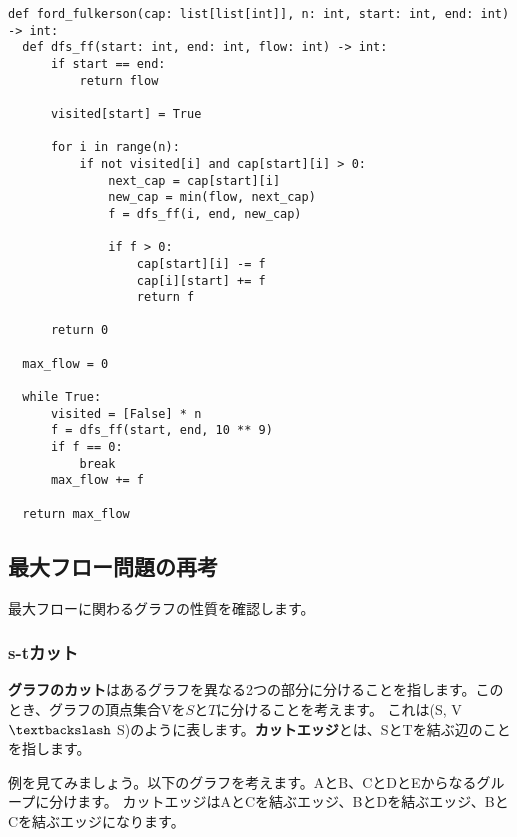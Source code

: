 \documentclass{jlreq}
\begin{document}
\begin{lstlisting}[caption=フォード・ファルカーソン法の実装, label=ford_fulkerson, frame=TRBL, label={ford_fulkerson}]
def ford_fulkerson(cap: list[list[int]], n: int, start: int, end: int) -> int:
  def dfs_ff(start: int, end: int, flow: int) -> int:
      if start == end:
          return flow

      visited[start] = True

      for i in range(n):
          if not visited[i] and cap[start][i] > 0: 
              next_cap = cap[start][i]
              new_cap = min(flow, next_cap)
              f = dfs_ff(i, end, new_cap)

              if f > 0:
                  cap[start][i] -= f
                  cap[i][start] += f
                  return f

      return 0

  max_flow = 0

  while True:
      visited = [False] * n
      f = dfs_ff(start, end, 10 ** 9)
      if f == 0:
          break
      max_flow += f

  return max_flow
\end{lstlisting}

\subsection{最大フロー問題の再考}
最大フローに関わるグラフの性質を確認します。
\subsubsection{s-tカット}
\textbf{グラフのカット}はあるグラフを異なる2つの部分に分けることを指します。このとき、グラフの頂点集合Vを$S$と$T$に分けることを考えます。
これは(S, V $\textbackslash$ S)のように表します。\textbf{カットエッジ}とは、SとTを結ぶ辺のことを指します。

例を見てみましょう。以下のグラフを考えます。AとB、CとDとEからなるグループに分けます。
カットエッジはAとCを結ぶエッジ、BとDを結ぶエッジ、BとCを結ぶエッジになります。

\vspace{0.5cm}

\begin{center}
\end{center}
\end{document}
